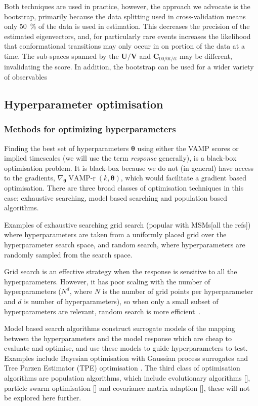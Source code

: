\documentclass[journal=jacsat,manuscript=article]{achemso}
\begin{document}
Both techniques are used in practice, however, the approach we  advocate is the bootstrap, primarily because the data splitting used in cross-validation means only \SI{50}{\percent} of the data is used in estimation.  This decreases the precision of the estimated eigenvectors, and, for particularly rare events increases the likelihood  that conformational transitions may only occur in on portion of the data at a time. The sub-spaces spanned by the $\mathbf{U}/\mathbf{V}$ and $\mathbf{C}_{00/0t/tt}$ may be different, invalidating the score. In addition, the bootstrap can be used for a wider variety of observables 
 
\subsection{Hyperparameter optimisation}

\subsubsection{Methods for optimizing hyperparameters}

Finding the best set of hyperparameters $\bm{\theta}$ using either the VAMP scores or implied timescales (we will use the term \emph{response} generally), is a black-box optimisation problem.  It is black-box because we do not (in general) have access to the gradients, $\nabla_{\bm{\theta}} \operatorname{VAMP-r}(k, \bm{\theta})$, which would facilitate a gradient based optimisation.  There are three broad classes of optimisation techniques in this case: exhaustive searching,  model based searching and population based algorithms. 

Examples of exhaustive searching grid search (popular with MSMs[all the refs]) where hyperparameters are taken from a uniformly placed grid over the hyperparameter search space, and random search, where hyperparameters are randomly sampled from the search space. 

Grid search is an effective strategy when the response is sensitive to all the hyperparameters.  However, it has poor scaling with the number of hyperparameters ($N^d$, where $N$ is the number of grid points per hyperparameter and $d$ is number of hyperparameters), so when only a small subset of hyperparameters are relevant, random search is more efficient~\cite{bergstra_jamesbergstra_random_2012}.  

Model based search algorithms construct surrogate models of the mapping between the hyperparameters and the model response which are cheap to evaluate and optimise, and use these models to guide hyperparameters to test. Examples include Bayesian optimisation with Gaussian process surrogates and Tree Parzen Estimator (TPE) optimisation \cite{bergstraAlgorithmsHyperParameterOptimizationa}.  The third class of optimisation algorithms are population algorithms, which include evolutionary algorithms [], particle swarm optimisation [] and covariance matrix adaption [], these will not be explored here further. 
\end{document}
